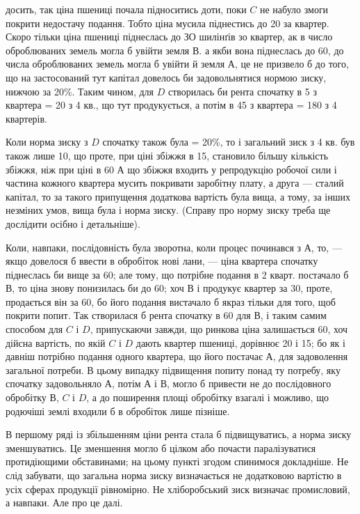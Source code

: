 \parcont{}  %
досить, так ціна пшениці почала підноситись доти, поки $C$ не набуло змоги
покрити недостачу подання. Тобто ціна мусила піднестись до 20 за
квартер. Скоро тільки ціна пшениці піднеслась до ЗО шилінґів зо квартер, ак
в число оброблюваних земель могла б увійти земля $В$. а якби вона піднеслась
до 60, до числа оброблюваних земель могла б увійти й земля $А$, це
не призвело б до того, що на застосований тут капітал довелось би задовольнятися
нормою зиску, нижчою за 20\%. Таким чином, для $D$ створилась би
рента спочатку в 5 з квартера = 20 з 4 кв., що тут продукується,
а потім в 45 з квартера = 180 з 4 квартерів.

Коли норма зиску з $D$ спочатку також була = 20\%, то і загальний зиск
з 4 кв. був також лише 10, що проте, при ціні збіжжя в 15, становило
більшу кількість збіжжя, ніж при ціні в 60 А що збіжжя входить
у репродукцію робочої сили і частина кожного квартера мусить покривати заробітну
плату, а друга — сталий капітал, то за такого припущення додаткова
вартість була вища, а тому, за інших незміних умов, вища була і норма зиску.
(Справу про норму зиску треба ще дослідити осібно і детальніше).

Коли, навпаки, послідовність була зворотна, коли процес починався з $А$,
то, — якщо довелося б ввести в обробіток нові лани, — ціна квартера спочатку
піднеслась би вище за 60; але тому, що потрібне подання в 2 кварт. постачало
б $В$, то ціна знову понизилась би до 60; хоч $В$ і продукує квартер
за 30, проте, продається він за 60, бо його подання вистачало б
якраз тільки для того, щоб покрити попит. Так створилася б рента спочатку в
60 для $В$, і таким самим способом для $C$ і $D$, припускаючи завжди, що
ринкова ціна залишається 60, хоч дійсна вартість, по якій $C$ і $D$ дають
квартер пшениці, дорівнює 20 і 15; бо як і давніш потрібно подання одного
квартера, що його постачає $А$, для задоволення загальної потреби. В цьому випадку
підвищення попиту понад ту потребу, яку спочатку задовольняло $А$, потім
$А$ і $В$, могло б привести не до послідовного обробітку $В$, $C$ і $D$, а до поширення
площі обробітку взагалі і можливо, що родючіші землі входили б в обробіток
лише пізніше.

В першому ряді із збільшенням ціни рента стала б підвищуватись, а норма
зиску зменшуватись. Це зменшення могло б цілком або почасти паралізуватися
протидіющими обставинами; на цьому пункті згодом спинимося докладніше.
Не слід забувати, що загальна норма зиску визначається не додатковою вартістю
в усіх сферах продукції рівномірно. Не хліборобський зиск визначає промисловий,
а навпаки. Але про це далі.

